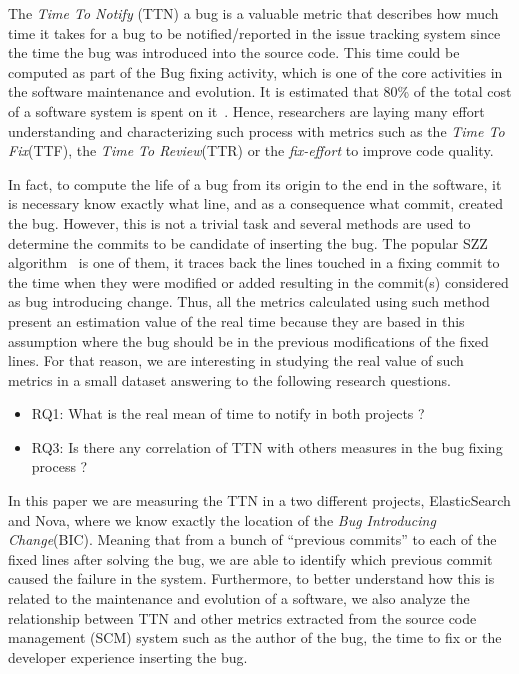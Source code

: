 \documentclass[10pt, conference]{IEEEtran}
\begin{document}
The \emph{Time To Notify} (TTN) a bug is a valuable metric that describes how much time it takes for a bug to be notified/reported in the issue tracking system since the time the bug was introduced into the source code. This time could be computed as part of the Bug fixing activity, which is one of the core activities in the software maintenance and evolution. It is estimated that 80\% of the total cost of a software system is spent on it~\cite{tassey2002economic}. Hence, researchers are laying many effort understanding and characterizing such process with metrics such as the \emph{Time To Fix}(TTF), the \emph{Time To Review}(TTR) or the \emph{fix-effort} to improve code quality.

In fact, to compute the life of a bug from its origin to the end in the software, it is necessary know exactly what line, and as a consequence what commit, created the bug. However, this is not a trivial task and several methods are used to determine the commits to be candidate of inserting the bug. The popular SZZ algorithm~\cite{sliwerski2005changes} is one of them, it traces back the lines touched in a fixing commit to the time when they were modified or added resulting in the commit(s) considered as bug introducing change. Thus, all the metrics calculated using such method present an estimation value of the real time because they are based in this assumption where the bug should be in the previous modifications of the fixed lines. For that reason, we are interesting in studying the real value of such metrics in a small dataset answering to the following research questions. 

\begin{itemize}
\item RQ1: What is the real mean of time to notify in both projects ?
\item RQ3: Is there any correlation of TTN with others measures in the bug fixing process ?
\end{itemize}

In this paper we are measuring the TTN in a two different projects, ElasticSearch and Nova, where we know exactly the location of the \emph{Bug Introducing Change}(BIC). Meaning that from a bunch of ``previous commits'' to each of the fixed lines after solving the bug, we are able to identify which previous commit caused the failure in the system. Furthermore, to better understand how this is related to the maintenance and evolution of a software, we also analyze the relationship between TTN and other metrics extracted from the source code management (SCM) system such as the author of the bug, the time to fix or the developer experience inserting the bug.
\end{document}
